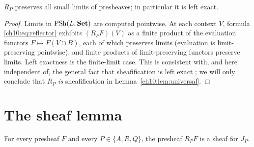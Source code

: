 \begin{proposition}
\label{ch10:prop:lex}
$R_P$ preserves all small limits of presheaves; in particular it is left
exact.
\end{proposition}

\begin{proof}
Limits in $\mathrm{PSh}(L, \mathbf{Set})$ are computed pointwise. At each context $V$, formula
\eqref{ch10:eq:reflector} exhibits $(R_P F)(V)$ as a finite product of the
evaluation functors $F \mapsto F(V \cap B)$, each of which preserves limits
(evaluation is limit-preserving pointwise), and finite products of
limit-preserving functors preserve limits. Left exactness is the finite-limit
case. This is consistent with, and here independent of, the general fact that
sheafification is left exact \cite{stacks00W1}; we will only conclude that
$R_P$ \emph{is} sheafification in Lemma~\ref{ch10:lem:universal}.
\end{proof}

\section{The sheaf lemma}
\label{ch10:sec:sheaf}

\begin{lemma}[$R_P F$ is a $J_P$-sheaf]
\label{ch10:lem:sheafness}
For every presheaf $F$ and every $P \in \{A, R, Q\}$, the presheaf $R_P F$ is
a sheaf for $J_P$.
\end{lemma}

